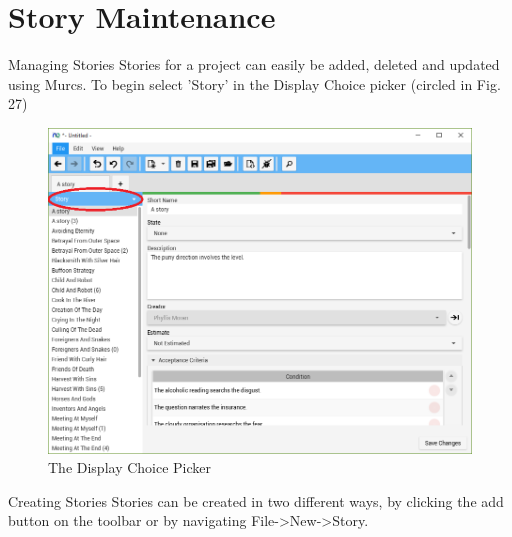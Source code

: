 \section{Story Maintenance}

Managing Stories
\newline
Stories for a project can easily be added, deleted and updated using Murcs. To begin select 'Story' in the Display Choice picker (circled in Fig. 27)

\begin{figure}[H]
\centering
\includegraphics[width=\textwidth]{images/screenshots/stories1.PNG}
\caption{The Display Choice Picker}
\label{fig:new_project}
\end{figure}

Creating Stories
\newline
Stories can be created in two different ways, by clicking the add button on the toolbar or by navigating File-\textgreater New-\textgreater Story.

